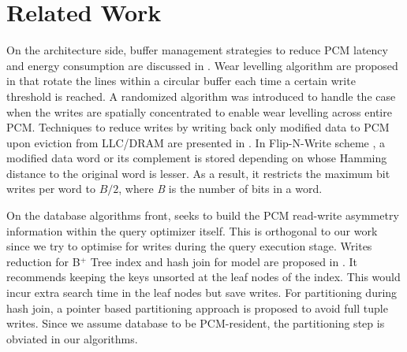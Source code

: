 \section{Related Work}
\label{relWork}
On the architecture side, buffer management strategies to reduce PCM latency and energy consumption are discussed in \cite{lee}. Wear levelling algorithm are proposed in \cite{wear} that rotate the lines within a circular buffer each time a certain write threshold is reached. A randomized algorithm was introduced to handle the case when the writes are spatially concentrated to enable wear levelling across entire PCM. Techniques to reduce writes by writing back only modified data to PCM upon eviction from LLC/DRAM are presented in \cite{qureshi, write, lee, zhou}. In Flip-N-Write scheme \cite{flipnwrite}, a modified data word or its complement is stored depending on whose Hamming distance to the original word is lesser. As a result, it restricts the maximum bit writes per word to $B/2$, where \textit{B} is the number of bits in a word.

On the database algorithms front, \cite{cost_aware} seeks to build the PCM read-write asymmetry information within the query optimizer itself. This is orthogonal to our work since we try to optimise for writes during the query execution stage. Writes reduction for B$^+$ Tree index and hash join for \modelPcmRam{} model are proposed in \cite{chen}. It recommends keeping the keys unsorted at the leaf nodes of the index. This would incur extra search time in the leaf nodes but save writes. For partitioning during hash join, a pointer based partitioning approach is proposed to avoid full tuple writes. Since we assume database to be PCM-resident, the partitioning step is obviated in our algorithms. 

